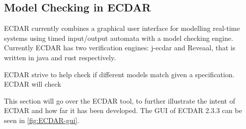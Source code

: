 \subsection{Model Checking in ECDAR}
ECDAR currently combines a graphical user interface for modelling real-time systems using timed input/output automata with a model checking engine. Currently ECDAR has two verification engines: j-ecdar and Reveaal, that is written in java and rust respectively.

ECDAR strive to help check if different models match given a specification. ECDAR will check 




This section will go over the ECDAR tool, to further illustrate the intent of ECDAR and how far it has been developed. The GUI of ECDAR 2.3.3 can be seen in \autoref{fig:ECDAR-gui}.